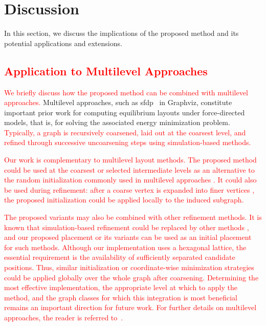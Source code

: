 \documentclass[11pt]{article}
\newcommand{\red}[1]{\textcolor{red}{#1}}
\begin{document}
\section{Discussion}
\label{sec:discussion}

In this section, we discuss the implications of the proposed method and its potential applications and extensions.

\subsection{\red{Application to Multilevel Approaches}}
\label{sec:application_like_multilevel}

\red{ We briefly discuss how the proposed method can be combined with multilevel approaches.}
Multilevel approaches, such as \textsf{sfdp}~\citep{Hu2006EfficientHF} in Graphviz, constitute important prior work for computing equilibrium layouts under force-directed models, that is, for solving the associated energy minimization problem.
\red{Typically, a graph is recursively coarsened, laid out at the coarsest level, and refined through successive uncoarsening steps using simulation-based methods.}

\red{
  Our work is complementary to multilevel layout methods.
  The proposed method could be used at the coarsest or selected intermediate levels as an alternative to the random initialization commonly used in multilevel approaches \citep{Hu2006EfficientHF,harelFastMultiScaleMethod2002}.
  It could also be used during refinement: after a coarse vertex is expanded into finer vertices \citep{Hu2006EfficientHF,harelFastMultiScaleMethod2002}, the proposed initialization could be applied locally to the induced subgraph.
}

\red{
  The proposed variants may also be combined with other refinement methods.
  It is known that simulation-based refinement could be replaced by other methods \citep{walshawMultilevelAlgorithmForceDirected2003}, and our proposed placement or its variants can be used as an initial placement for such methods.
  Although our implementation uses a hexagonal lattice, the essential requirement is the availability of sufficiently separated candidate positions.
  Thus, similar initialization or coordinate-wise minimization strategies could be applied globally over the whole graph after coarsening.
  Determining the most effective implementation, the appropriate level at which to apply the method, and the graph classes for which this integration is most beneficial remains an important direction for future work.
  For further details on multilevel approaches, the reader is referred to~\citep{arleoMultilevelApproachEventBased2021}.
}
\end{document}
